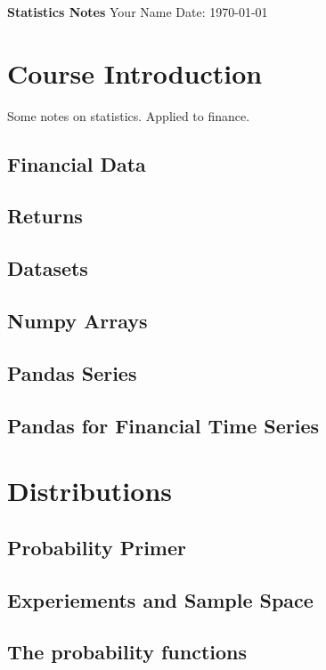 \documentclass[11pt]{article}
\begin{document}
    \begin{titlepage}
        \centering
        \vspace*{2in}
        \Huge \textbf{Statistics Notes}
        \vfill
        \Large Your Name
        \vfill
        \Large Date: \today
    \end{titlepage}

    \newpage

    \tableofcontents
    \newpage


    \chapter{Course Introduction}
    Some notes on statistics. Applied to finance.
    \section{Financial Data}
    \section{Returns}
    \section{Datasets}
    \section{Numpy Arrays}
    \section{Pandas Series}
    \section{Pandas for Financial Time Series}

    \chapter{Distributions}

    \section{Probability Primer}
    \section{Experiements and Sample Space}
    \section{The probability functions}
\end{document}
